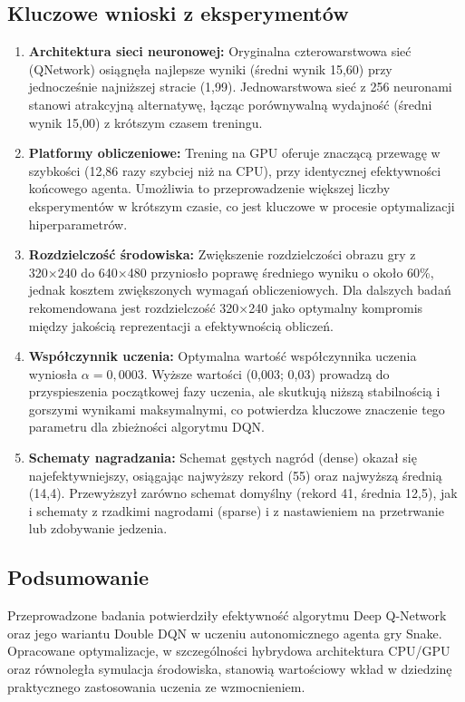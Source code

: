 \documentclass[a4paper,12pt]{article}
\begin{document}
\subsection*{Kluczowe wnioski z eksperymentów}
\begin{enumerate}
  \item \textbf{Architektura sieci neuronowej:} Oryginalna czterowarstwowa sieć (QNetwork) osiągnęła najlepsze wyniki (średni wynik 15,60) przy jednocześnie najniższej stracie (1,99). Jednowarstwowa sieć z 256 neuronami stanowi atrakcyjną alternatywę, łącząc porównywalną wydajność (średni wynik 15,00) z krótszym czasem treningu.
  \item \textbf{Platformy obliczeniowe:} Trening na GPU oferuje znaczącą przewagę w szybkości (12,86 razy szybciej niż na CPU), przy identycznej efektywności końcowego agenta. Umożliwia to przeprowadzenie większej liczby eksperymentów w krótszym czasie, co jest kluczowe w procesie optymalizacji hiperparametrów.
  \item \textbf{Rozdzielczość środowiska:} Zwiększenie rozdzielczości obrazu gry z 320×240 do 640×480 przyniosło poprawę średniego wyniku o około 60\%, jednak kosztem zwiększonych wymagań obliczeniowych. Dla dalszych badań rekomendowana jest rozdzielczość 320×240 jako optymalny kompromis między jakością reprezentacji a efektywnością obliczeń.
  \item \textbf{Współczynnik uczenia:} Optymalna wartość współczynnika uczenia wyniosła \(\alpha = 0{,}0003\). Wyższe wartości (0,003; 0,03) prowadzą do przyspieszenia początkowej fazy uczenia, ale skutkują niższą stabilnością i gorszymi wynikami maksymalnymi, co potwierdza kluczowe znaczenie tego parametru dla zbieżności algorytmu DQN.
  \item \textbf{Schematy nagradzania:} Schemat gęstych nagród (dense) okazał się najefektywniejszy, osiągając najwyższy rekord (55) oraz najwyższą średnią (14,4). Przewyższył zarówno schemat domyślny (rekord 41, średnia 12,5), jak i schematy z rzadkimi nagrodami (sparse) i z nastawieniem na przetrwanie lub zdobywanie jedzenia.
\end{enumerate}

\subsection*{Podsumowanie}

Przeprowadzone badania potwierdziły efektywność algorytmu Deep Q-Network oraz jego wariantu Double DQN w uczeniu autonomicznego agenta gry Snake. Opracowane optymalizacje, w szczególności hybrydowa architektura CPU/GPU oraz równoległa symulacja środowiska, stanowią wartościowy wkład w dziedzinę praktycznego zastosowania uczenia ze wzmocnieniem.
\end{document}
